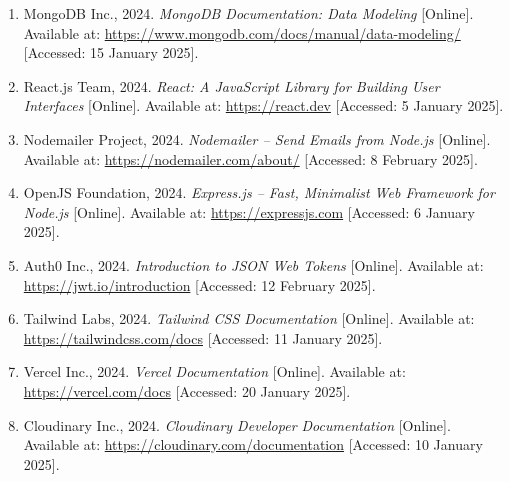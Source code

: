 \begin{enumerate}
    \item MongoDB Inc., 2024. \textit{MongoDB Documentation: Data Modeling} [Online]. Available at: \url{https://www.mongodb.com/docs/manual/data-modeling/} [Accessed: 15 January 2025].
    \item React.js Team, 2024. \textit{React: A JavaScript Library for Building User Interfaces} [Online]. Available at: \url{https://react.dev} [Accessed: 5 January 2025].
    \item Nodemailer Project, 2024. \textit{Nodemailer -- Send Emails from Node.js} [Online]. Available at: \url{https://nodemailer.com/about/} [Accessed: 8 February 2025].
    \item OpenJS Foundation, 2024. \textit{Express.js -- Fast, Minimalist Web Framework for Node.js} [Online]. Available at: \url{https://expressjs.com} [Accessed: 6 January 2025].
    \item Auth0 Inc., 2024. \textit{Introduction to JSON Web Tokens} [Online]. Available at: \url{https://jwt.io/introduction} [Accessed: 12 February 2025].
    \item Tailwind Labs, 2024. \textit{Tailwind CSS Documentation} [Online]. Available at: \url{https://tailwindcss.com/docs} [Accessed: 11 January 2025].
    \item Vercel Inc., 2024. \textit{Vercel Documentation} [Online]. Available at: \url{https://vercel.com/docs} [Accessed: 20 January 2025].
    \item Cloudinary Inc., 2024. \textit{Cloudinary Developer Documentation} [Online]. Available at: \url{https://cloudinary.com/documentation} [Accessed: 10 January 2025].
\end{enumerate}
